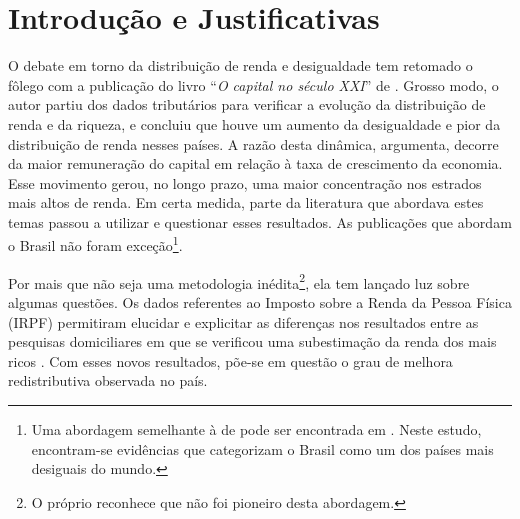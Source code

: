\section{Introdução e Justificativas}\label{Intro}


O debate em torno da distribuição de renda e desigualdade tem retomado o fôlego com a publicação do livro ``\textit{O capital no século XXI}'' de \textcite{piketty_o_2014}. 
Grosso modo, o autor partiu dos dados tributários para verificar a evolução da distribuição de renda e da riqueza, e concluiu que houve um aumento da desigualdade e pior da distribuição de renda nesses países. A razão desta dinâmica, argumenta, decorre da maior remuneração do capital em relação à taxa de crescimento da economia. Esse movimento gerou, no longo prazo, uma maior concentração nos estrados mais altos de renda.
Em certa medida, parte da literatura que abordava estes temas passou a utilizar e questionar esses resultados. As publicações que abordam o Brasil não foram exceção\footnote{Uma abordagem semelhante à de \textcite{piketty_o_2014} pode ser encontrada em \textcite{mila_income_2015}. Neste estudo, encontram-se evidências que categorizam o Brasil como um dos países mais desiguais do mundo.}.



Por mais que não seja uma metodologia inédita\footnote{O próprio \textcite{piketty_o_2014} reconhece que não foi pioneiro desta abordagem.}, ela tem lançado luz sobre algumas questões. Os dados referentes ao Imposto sobre a Renda da Pessoa Física (IRPF) permitiram elucidar e explicitar as diferenças nos resultados entre as pesquisas domiciliares em que se verificou uma subestimação da renda dos mais ricos \cites{afonso_irpf_2014}{medeiros_upper_2015}. Com esses novos resultados, põe-se em questão o grau de melhora redistributiva observada no país.



